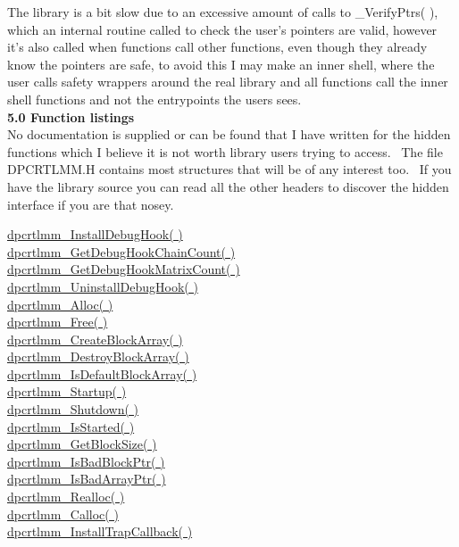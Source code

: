 \documentclass{article}
\begin{document}
\par The library is a bit slow due to an excessive amount of calls to
\_VerifyPtrs(
), which an internal routine called to check the user's pointers are
valid,
however it's also called when functions call other functions, even
though
they already know the pointers are safe, to avoid this I may make an
inner
shell, where the user calls safety wrappers around the real library and
all functions call the inner shell functions and not the entrypoints
the
users sees.
\\
\textbf{5.0 Function listings}
\\
No documentation is supplied or can be found that I have written for
the hidden functions which I believe it is not worth library users
trying
to access.~ The file DPCRTLMM.H contains most structures that will
be of any interest too.~ If you have the library source you can
read
all the other headers to discover the hidden interface if you are that
nosey.
\par \href{#InstallDebugHook}{dpcrtlmm\_InstallDebugHook( )}
\\
\href{#GetDebugHookChainCount}{dpcrtlmm\_GetDebugHookChainCount(
)}
\\
\href{#GetDebugHookMatrixCount}{dpcrtlmm\_GetDebugHookMatrixCount(
)}
\\
\href{#UninstallDebugHook}{dpcrtlmm\_UninstallDebugHook( )}
\\
\href{#Alloc}{dpcrtlmm\_Alloc( )}
\\
\href{#Free}{dpcrtlmm\_Free( )}
\\
\href{#CreateBlockArray}{dpcrtlmm\_CreateBlockArray( )}
\\
\href{#DestroyBlockArray}{dpcrtlmm\_DestroyBlockArray( )}
\\
\href{#IsDefaultBlockArray}{dpcrtlmm\_IsDefaultBlockArray( )}
\\
\href{#Startup}{dpcrtlmm\_Startup( )}
\\
\href{#Shutdown}{dpcrtlmm\_Shutdown( )}
\\
\href{#IsStarted}{dpcrtlmm\_IsStarted( )}
\\
\href{#GetBlockSize}{dpcrtlmm\_GetBlockSize( )}
\\
\href{#IsBasBlockPtr}{dpcrtlmm\_IsBadBlockPtr( )}
\\
\href{#IsBadArrayPtr}{dpcrtlmm\_IsBadArrayPtr( )}
\\
\href{#Realloc}{dpcrtlmm\_Realloc( )}
\\
\href{#Calloc}{dpcrtlmm\_Calloc( )}
\\
\href{#InstallTrapCallback}{dpcrtlmm\_InstallTrapCallback( )}
\end{document}
